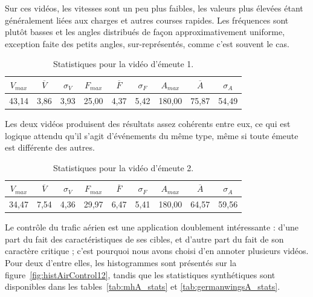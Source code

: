 	Sur ces vidéos, les vitesses sont un peu plus faibles, les valeurs plus élevées étant généralement liées aux charges et autres courses rapides. Les fréquences sont plutôt basses et les angles distribués de façon approximativement uniforme, exception faite des petits angles, sur-représentés, comme c'est souvent le cas.
	
\begin{table}
	\centering
	\begin{tabular}{c c c c c c c c c}
		$V_{max}$	& $\overline{V}$	& $\sigma_{V}$	& $F_{max}$	& $\overline{F}$	& $\sigma_{F}$	& $A_{max}$	& $\overline{A}$	& $\sigma_{A}$	\bigstrut[b] \\ \hline

		43,14		& 3,86				& 3,93			& 25,00		& 4,37				& 5,42			& 180,00	& 75,87				& 54,49			\bigstrut[t] \\
	\end{tabular}
	\caption[Statistiques pour la vidéo d'émeute 1]{Statistiques pour la vidéo d'émeute 1.}
	\label{tab:riot_stats}
\end{table}

	Les deux vidéos produisent des résultats assez cohérents entre eux, ce qui est logique attendu qu'il s'agit d'événements du même type, même si toute émeute est différente des autres.

\begin{table}
	\centering
	\begin{tabular}{c c c c c c c c c}
		$V_{max}$	& $\overline{V}$	& $\sigma_{V}$	& $F_{max}$	& $\overline{F}$	& $\sigma_{F}$	& $A_{max}$	& $\overline{A}$	& $\sigma_{A}$	\bigstrut[b] \\ \hline

		34,47		& 7,54				& 4,36			& 29,97		& 6,47				& 5,41			& 180,00	& 64,57				& 59,56			\bigstrut[t] \\
	\end{tabular}
	\caption[Statistiques pour la vidéo d'émeute 2]{Statistiques pour la vidéo d'émeute 2.}
	\label{tab:riot2a_stats}
\end{table}

	Le contrôle du trafic aérien est une application doublement intéressante : d'une part du fait des caractéristiques de ses cibles, et d'autre part du fait de son caractère critique ; c'est pourquoi nous avons choisi d'en annoter plusieurs vidéos. Pour deux d'entre elles, les histogrammes sont présentés sur la figure~\ref{fig:histAirControl12}, tandis que les statistiques synthétiques sont disponibles dans les tables~\ref{tab:mhA_stats} et \ref{tab:germanwingsA_stats}.
	
